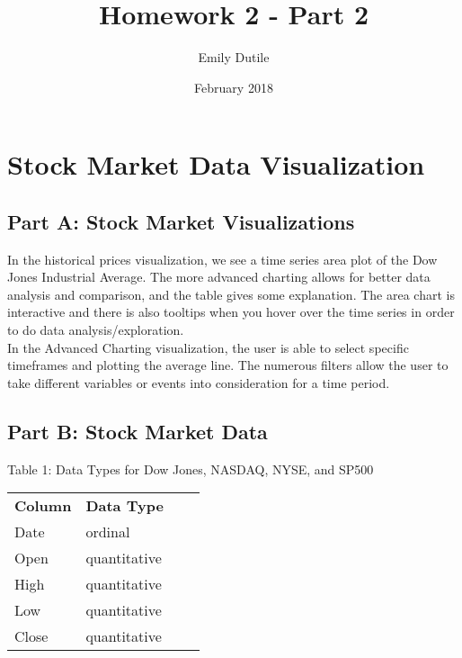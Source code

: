\documentclass{neu_handout}
\title{Homework 2 - Part 2}
\author{Emily Dutile}
\date{February 2018}
\begin{document}
\section*{Stock Market Data Visualization}

\subsection*{Part A: Stock Market Visualizations}
In the historical prices visualization, we see a time series area plot of the Dow Jones Industrial Average. The more advanced charting allows for better data analysis and comparison, and the table gives some explanation. The area chart is interactive and there is also tooltips when you hover over the time series in order to do data analysis/exploration.\\

In the Advanced Charting visualization, the user is able to select specific timeframes and plotting the average line. The numerous filters allow the user to take different variables or events into consideration for a time period.

\subsection*{Part B: Stock Market Data}

\begin{center}
Table 1: Data Types for Dow Jones, NASDAQ, NYSE, and SP500
\end{center}
\begin{center} 
\begin{tabular}[h]{l l l l}
\textbf{Column} & \textbf{Data Type} \\
Date & ordinal \\
Open & quantitative \\ 
High & quantitative \\
Low & quantitative \\
Close & quantitative \\

\end{tabular}
\end{center}
\end{document}
